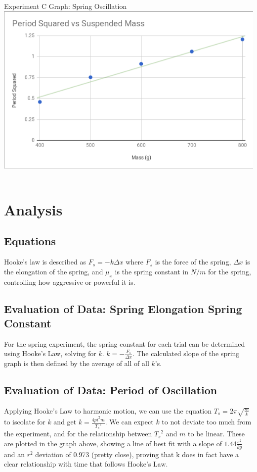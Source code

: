 \documentclass[12pt]{article}
\begin{document}
        {\large Experiment C Graph: Spring Oscillation} \\
        \includegraphics[width=\textwidth]{Graph1.png} \\ \\
    \section{Analysis}
        \subsection{Equations}
            Hooke's law is described as $F_s = -k \Delta x$ where $F_s$ is
            the force of the spring, $\Delta x$ is the elongation of the
            spring, and $\mu_x$ is the spring constant in $N/m$ for the spring,
            controlling how aggressive or powerful it is.
        \subsection{Evaluation of Data: Spring Elongation Spring Constant}
            For the spring experiment, the spring constant for each trial can be
            determined using Hooke's Law, solving for $k$.
            $k = -\frac{F_s}{\Delta x}$. The calculated slope of the spring
            graph is then defined by the average of all of all $k$'s.
        \subsection{Evaluation of Data: Period of Oscillation}
            Applying Hooke's Law to harmonic motion, we can use the equation
            $T_s = 2\pi \sqrt{ \frac{m}{k}}$ to iscolate for $k$ and 
            get $k = \frac{4pi^2m}{{T_s}^2}$. We can expect $k$ to not
            deviate too much from the experiment, and for the relationship between
            ${T_s}^2$ and $m$ to be linear. These are plotted in the graph above,
            showing a line of best fit with a slope of $1.44 \frac{s^2}{kg}$ and
            an $r^2$ deviation of 0.973 (pretty close), proving that k does in fact
            have a clear relationship with time that follows Hooke's Law.
\end{document}
